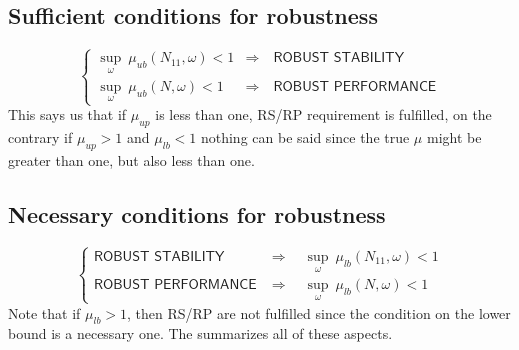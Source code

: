 \documentclass[a4paper, 12pt]{article}
\begin{document}
\subsection{Sufficient conditions for robustness}
\begin{equation}
    \begin{cases}
        \underset{\omega}{\sup} \ \mu_{ub}(N_{11},\omega) < 1& \Longrightarrow \quad \textsf{ROBUST STABILITY}\\
        \underset{\omega}{\sup} \  \mu_{ub}(N,\omega) < 1 & \Longrightarrow \quad \textsf{ROBUST PERFORMANCE}
    \end{cases}
\end{equation}
This says us that if $\mu_{up}$ is less than one, RS/RP requirement is fulfilled, on the contrary if $\mu_{up}>1$ and $\mu_{lb}<1$ nothing can be said since the true $\mu$ might be greater than one, but also less than one.

\subsection{Necessary conditions for robustness}
\begin{equation}
    \begin{cases}
        \textsf{ROBUST STABILITY} & \Longrightarrow  \quad
        \underset{\omega}{\sup} \ \mu_{lb}(N_{11},\omega) < 1\\
        \textsf{ROBUST PERFORMANCE} & \Longrightarrow \quad
        \underset{\omega}{\sup} \ \mu_{lb}(N,\omega) < 1 
    \end{cases}
\end{equation}
Note that if $\mu_{lb} > 1$, then RS/RP are not fulfilled since the condition on the lower bound is a necessary one. The  summarizes all of these aspects.
\end{document}
